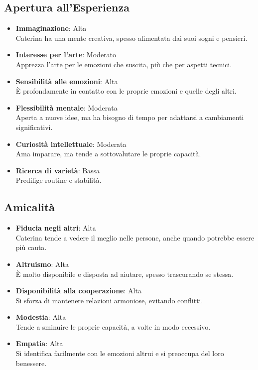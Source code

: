 \subsection*{Apertura all’Esperienza}
\begin{itemize}
    \item \textbf{Immaginazione}: Alta \\
    Caterina ha una mente creativa, spesso alimentata dai suoi sogni e pensieri.
    
    \item \textbf{Interesse per l’arte}: Moderato \\
    Apprezza l’arte per le emozioni che suscita, più che per aspetti tecnici.
    
    \item \textbf{Sensibilità alle emozioni}: Alta \\
    È profondamente in contatto con le proprie emozioni e quelle degli altri.
    
    \item \textbf{Flessibilità mentale}: Moderata \\
    Aperta a nuove idee, ma ha bisogno di tempo per adattarsi a cambiamenti significativi.
    
    \item \textbf{Curiosità intellettuale}: Moderata \\
    Ama imparare, ma tende a sottovalutare le proprie capacità.
    
    \item \textbf{Ricerca di varietà}: Bassa \\
    Predilige routine e stabilità.
\end{itemize}

\subsection*{Amicalità}
\begin{itemize}
    \item \textbf{Fiducia negli altri}: Alta \\
    Caterina tende a vedere il meglio nelle persone, anche quando potrebbe essere più cauta.
    
    \item \textbf{Altruismo}: Alta \\
    È molto disponibile e disposta ad aiutare, spesso trascurando se stessa.
    
    \item \textbf{Disponibilità alla cooperazione}: Alta \\
    Si sforza di mantenere relazioni armoniose, evitando conflitti.
    
    \item \textbf{Modestia}: Alta \\
    Tende a sminuire le proprie capacità, a volte in modo eccessivo.
    
    \item \textbf{Empatia}: Alta \\
    Si identifica facilmente con le emozioni altrui e si preoccupa del loro benessere.
\end{itemize}

